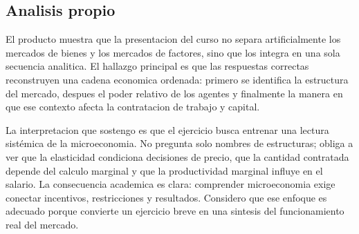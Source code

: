 \documentclass[
	spanish,
	letterpaper, oneside
]{article}
\begin{document}
%

\subsection{Analisis propio}

El producto muestra que la presentacion del curso no separa artificialmente los mercados de bienes y los mercados de factores, sino que los integra en una sola secuencia analitica. El hallazgo principal es que las respuestas correctas reconstruyen una cadena economica ordenada: primero se identifica la estructura del mercado, despues el poder relativo de los agentes y finalmente la manera en que ese contexto afecta la contratacion de trabajo y capital.

La interpretacion que sostengo es que el ejercicio busca entrenar una lectura sistémica de la microeconomia. No pregunta solo nombres de estructuras; obliga a ver que la elasticidad condiciona decisiones de precio, que la cantidad contratada depende del calculo marginal y que la productividad marginal influye en el salario. La consecuencia academica es clara: comprender microeconomia exige conectar incentivos, restricciones y resultados. Considero que ese enfoque es adecuado porque convierte un ejercicio breve en una sintesis del funcionamiento real del mercado.

\end{document}
